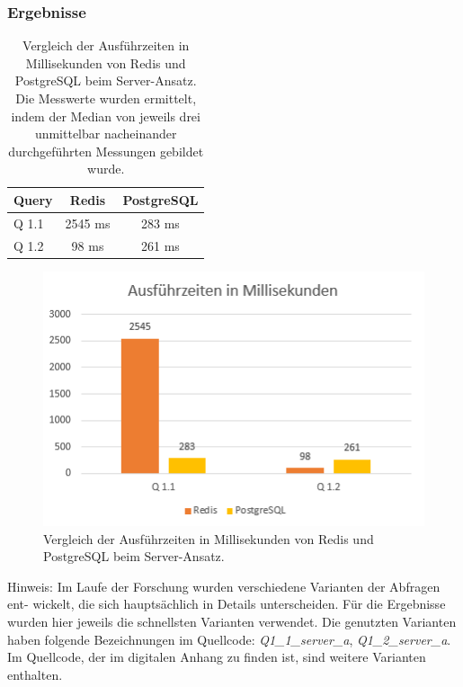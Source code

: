 \subsubsection{Ergebnisse}

\begin{table}[h]
\centering
\begin{tabular}{lcc}
\hline
Query & Redis & PostgreSQL \\ \hline
Q 1.1 & 2545 ms  & 283 ms       \\
Q 1.2 & 98 ms    & 261 ms       \\ \hline
\end{tabular}
\caption{Vergleich der Ausführzeiten in Millisekunden von Redis und PostgreSQL beim Server-Ansatz.\\
 Die Messwerte wurden ermittelt, indem der Median von jeweils drei unmittelbar nacheinander durchgeführten Messungen gebildet wurde.}
\label{tab:results-server}
\end{table}

\begin{figure}[ht]  %
    \centering      %
    \includegraphics[width=1\textwidth]{pictures/results/results-server.png}
    \caption{Vergleich der Ausführzeiten in Millisekunden von Redis und PostgreSQL beim Server-Ansatz.}      %
    \label{pic:results-server}    %
\end{figure}

Hinweis: Im Laufe der Forschung wurden verschiedene Varianten der Abfragen ent-
wickelt, die sich hauptsächlich in Details unterscheiden. Für die Ergebnisse wurden
hier jeweils die schnellsten Varianten verwendet. Die
genutzten Varianten haben folgende Bezeichnungen im Quellcode: \emph{Q1\_1\_server\_a}, \emph{Q1\_2\_server\_a}. Im Quellcode,
der im digitalen Anhang zu finden ist, sind weitere Varianten enthalten.


